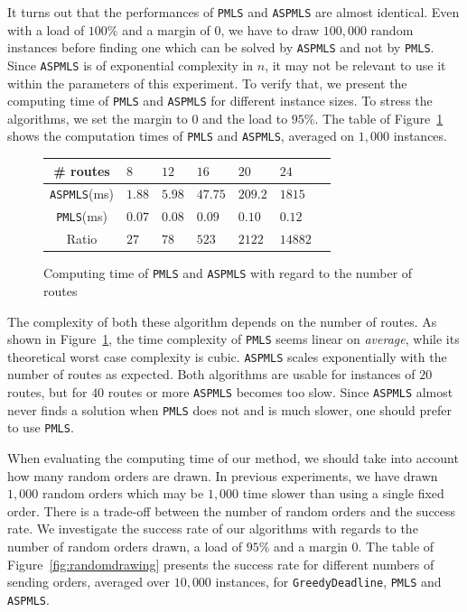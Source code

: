 \documentclass[a4paper,10pt]{article}
\newcommand\greedydeadline{\texttt{GreedyDeadline}\xspace}
\newcommand\PMLS{\texttt{PMLS}\xspace}
\newcommand\ASPMLS{\texttt{ASPMLS}\xspace}
\begin{document}
     It turns out that the performances of \PMLS and \ASPMLS are almost identical. Even with a load of $100\%$ and a margin of $0$, we have to draw $100,000$ random instances before finding one which can be solved by \ASPMLS and not by \PMLS. Since \ASPMLS is of exponential complexity in $n$, it may not be relevant to use it within the parameters of this experiment. To verify that, we present the computing time of \PMLS and \ASPMLS for different instance sizes. To stress the algorithms, we set the margin to $0$ and the load to $95\%$. The table of Figure~\ref{fig:tps_fpt} shows the computation times of \PMLS and \ASPMLS, averaged on $1,000$ instances. 

     
          \begin{figure}[h] 
       \begin{center}
   \begin{tabularx}{0.8\textwidth}{|c|X|X|X|X|X|X|}
    \hline
    \# routes& $8$ & $12$ & $16$& $20$ & $24$\\
    \hline
    \ASPMLS (ms) & $1.88$ &$5.98$&$47.75$&$209.2$&$1815$\\
    \hline
     \PMLS (ms) & $0.07$ &$0.08$&$0.09$&$0.10$&$0.12$\\
    \hline
    Ratio & $27$ &$78$&$523$&$2122$&$14882$\\
    \hline
      \end{tabularx}
      \end{center}
   \caption{Computing time of \PMLS and \ASPMLS with regard to the number of routes}
        \label{fig:tps_fpt}
     \end{figure}
    

  The complexity of both these algorithm depends on the number of routes. As shown in Figure~\ref{fig:tps_fpt}, the time complexity of \PMLS seems linear on \emph{average}, while its theoretical worst case complexity is cubic. \ASPMLS scales exponentially with the number of routes as expected. Both algorithms are usable for instances of $20$ routes, but for $40$ routes or more \ASPMLS becomes too slow. Since \ASPMLS almost never finds a solution when \PMLS does not and is much slower, one should prefer to use \PMLS. 

    When evaluating the computing time of our method, we should take into account how many random orders are drawn. In previous experiments, we have drawn $1,000$ random orders which may be $1,000$ time slower than using a single fixed order. There is a trade-off between the number of random orders and the success rate. We investigate the success rate of our algorithms with regards to the number of random orders drawn, a load of $95\%$ and a margin $0$. The table of Figure~\ref{fig:randomdrawing} presents the success rate for different numbers of sending orders, averaged over $10,000$ instances, for \greedydeadline, \PMLS and \ASPMLS.
\end{document}
